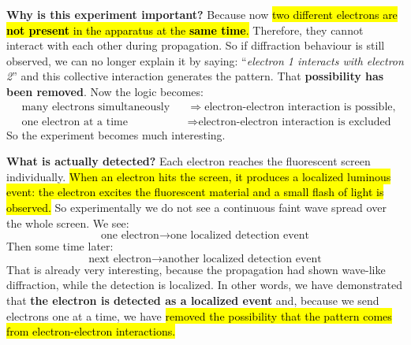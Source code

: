 \noindent
\textcolor{Green3}{ \textbf{Why is this experiment important?}} Because now \hl{two different electrons are \textbf{not present} in the apparatus at the \textbf{same time}.} Therefore, they cannot interact with each other during propagation. So if diffraction behaviour is still observed, we can no longer explain it by saying: ``\emph{electron 1 interacts with electron 2}'' and this collective interaction generates the pattern. That \textbf{possibility has been removed}. Now the logic becomes:
\begin{equation*}
    \begin{aligned}
        &\text{many electrons simultaneously}
        &&\Rightarrow \text{electron-electron interaction is possible},\\
        &\text{one electron at a time}
        &&\Rightarrow \text{electron-electron interaction is excluded}
    \end{aligned}
\end{equation*}
So the experiment becomes much interesting.

\highspace
\textcolor{Green3}{ \textbf{What is actually detected?}} Each electron reaches the fluorescent screen individually. \hl{When an electron hits the screen, it produces a localized luminous event: the electron excites the fluorescent material and a small flash of light is observed.} So experimentally we do not see a continuous faint wave spread over the whole screen. We see:
\begin{equation*}
    \text{one electron} \rightarrow \text{one localized detection event}
\end{equation*}
Then some time later:
\begin{equation*}
    \text{next electron} \rightarrow \text{another localized detection event}
\end{equation*}
That is already very interesting, because the propagation had shown wave-like diffraction, while the detection is localized. In other words, we have demonstrated that \textbf{the electron is detected as a localized event} and, because we send electrons one at a time, we have \hl{removed the possibility that the pattern comes from electron-electron interactions.}

